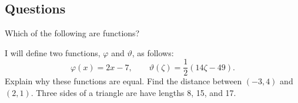 \subsection*{Questions}
\begin{questions}
  \question Which of the following are functions?
  \question I will define two functions, $ \varphi $ and $ \vartheta $, as follows:
            \begin{displaymath}
              \varphi(x) = 2x - 7, \qquad \vartheta(\zeta) = \frac{1}{2}(14\zeta - 49).
            \end{displaymath}
            Explain why these functions are equal.
  \question Find the distance between $ (-3, 4) $ and $ (2, 1) $.
  \question Three sides of a triangle are have lengths 8, 15, and 17.
\end{questions}
